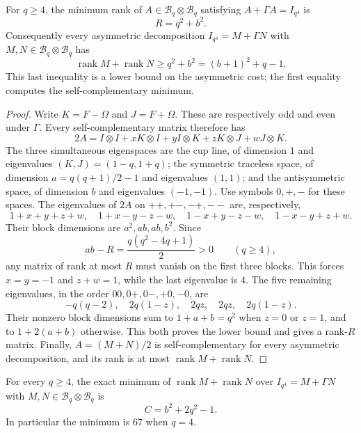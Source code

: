 \begin{proposition}
\label{prop:flip-cup-two-copy}
For $q\ge4$, the minimum rank of
$A\in\mathcal B_q\otimes\mathcal B_q$ satisfying
$A+\Gamma A=I_{q^4}$ is
\[
 R=q^2+b^2.
\]
Consequently every asymmetric decomposition
$I_{q^4}=M+\Gamma N$ with
$M,N\in\mathcal B_q\otimes\mathcal B_q$ has
\[
 \operatorname{rank}M+\operatorname{rank}N
 \ge q^2+b^2=(b+1)^2+q-1.
\]
This last inequality is a lower bound on the asymmetric cost; the
first equality computes the self-complementary minimum.
\end{proposition}

\begin{proof}
Write $K=F-\Omega$ and $J=F+\Omega$. These are respectively odd and
even under $\Gamma$. Every self-complementary matrix therefore has
\[
 2A=I\otimes I+xK\otimes I+yI\otimes K
                  +zK\otimes J+wJ\otimes K.
\]
The three simultaneous eigenspaces are the cup line, of dimension
$1$ and eigenvalues $(K,J)=(1-q,1+q)$; the symmetric traceless
space, of dimension $a=q(q+1)/2-1$ and eigenvalues $(1,1)$; and the
antisymmetric space, of dimension $b$ and eigenvalues $(-1,-1)$.
Use symbols $0,+,-$ for these spaces.
The eigenvalues of $2A$ on $++,+-,-+,--$ are, respectively,
\[
 1+x+y+z+w,\quad 1+x-y-z-w,\quad
 1-x+y-z-w,\quad 1-x-y+z+w.
\]
Their block dimensions are $a^2,ab,ab,b^2$. Since
\[
 ab-R=\frac{q(q^2-4q+1)}2>0\qquad(q\ge4),
\]
any matrix of rank at most $R$ must vanish on the first three
blocks. This forces $x=y=-1$ and $z+w=1$, while the last eigenvalue
is $4$. The five remaining eigenvalues, in the order
$00,0+,0-,+0,-0$, are
\[
 -q(q-2),\quad 2q(1-z),\quad2qz,\quad2qz,\quad2q(1-z).
\]
Their nonzero block dimensions sum to $1+a+b=q^2$ when $z=0$ or
$z=1$, and to $1+2(a+b)$ otherwise. This both proves the lower bound
and gives a rank-$R$ matrix. Finally,
$A=(M+N)/2$ is self-complementary for every asymmetric decomposition,
and its rank is at most $\operatorname{rank}M+\operatorname{rank}N$.
\end{proof}


\begin{proposition}
\label{prop:flip-cup-asymmetric-two-copy}
For every $q\ge4$, the exact minimum of
$\operatorname{rank}M+\operatorname{rank}N$ over
$I_{q^4}=M+\Gamma N$ with
$M,N\in\mathcal B_q\otimes\mathcal B_q$ is
\[
 C=b^2+2q^2-1.
\]
In particular the minimum is $67$ when $q=4$.
\end{proposition}


